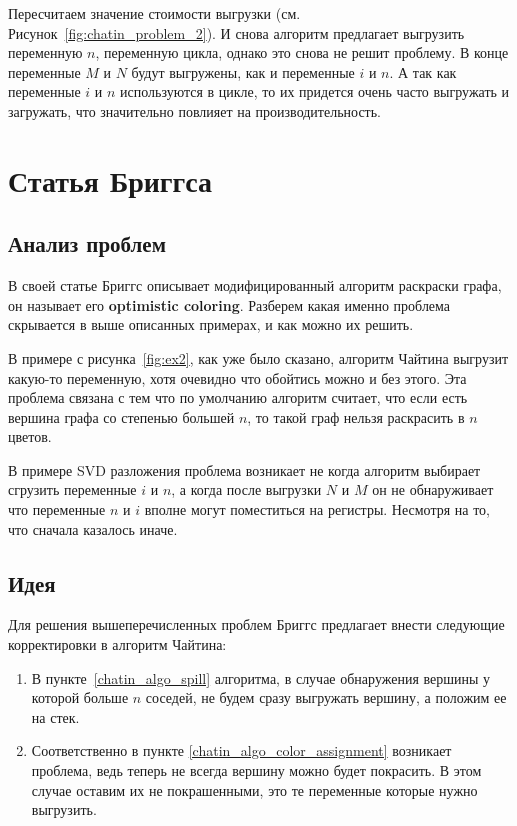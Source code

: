 Пересчитаем значение стоимости выгрузки (см. Рисунок~\ref{fig:chatin_problem_2}). И снова алгоритм предлагает
выгрузить переменную $n$, переменную цикла, однако это снова не решит проблему.
В конце переменные $M$ и $N$ будут выгружены, как и переменные $i$ и $n$.
А так как переменные $i$ и $n$ используются в цикле, то их придется очень часто выгружать и загружать, что
значительно повлияет на производительность.

\section{Статья Бриггса}

\subsection{Анализ проблем}

В своей статье Бриггс описывает модифицированный алгоритм раскраски графа, он называет его \textbf{optimistic coloring}.
Разберем какая именно проблема скрывается в выше описанных примерах, и как можно их решить.

В примере с рисунка~\ref{fig:ex2}, как уже было сказано, алгоритм Чайтина выгрузит какую-то переменную,
хотя очевидно что обойтись можно и без этого. Эта проблема связана с тем что по умолчанию алгоритм считает,
что если есть вершина графа со степенью большей $n$, то такой граф нельзя раскрасить в $n$ цветов.

В примере SVD разложения проблема возникает не когда алгоритм выбирает сгрузить переменные $i$ и $n$, а когда
после выгрузки $N$ и $M$ он не обнаруживает что переменные $n$ и $i$ вполне могут поместиться на регистры.
Несмотря на то, что сначала казалось иначе.

\subsection{Идея}

Для решения вышеперечисленных проблем Бриггс предлагает внести следующие корректировки в алгоритм Чайтина:

\begin{enumerate}
    \item В пункте~\ref{chatin_algo_spill} алгоритма, в случае обнаружения вершины у которой больше $n$ соседей,
    не будем сразу выгружать вершину, а положим ее на стек. \label{briggs_change_spill}
    \item Соответственно в пункте \ref{chatin_algo_color_assignment} возникает проблема, ведь теперь не всегда
    вершину можно будет покрасить. В этом случае оставим их не покрашенными, это те переменные которые нужно
    выгрузить.
    
\end{enumerate}

